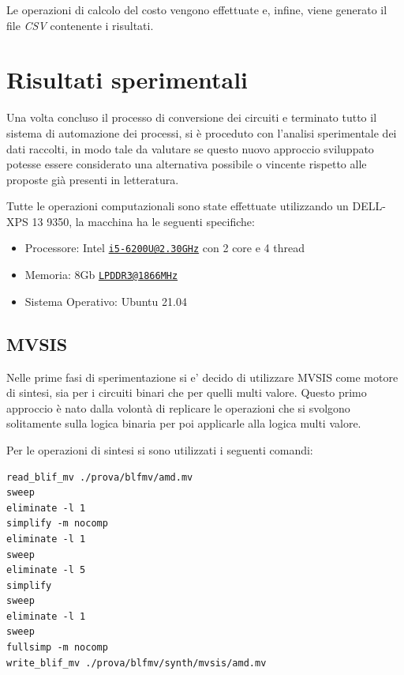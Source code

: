 \documentclass[
]{book}
\providecommand{\tightlist}{%
  \setlength{\itemsep}{0pt}\setlength{\parskip}{0pt}}
\begin{document}
Le operazioni di calcolo del costo vengono effettuate e, infine, viene generato il file \emph{CSV} contenente i risultati.

\hypertarget{risultati-sperimentali}{%
\chapter{Risultati sperimentali}\label{risultati-sperimentali}}

Una volta concluso il processo di conversione dei circuiti e terminato tutto il sistema di automazione dei processi, si è proceduto con l'analisi sperimentale dei dati raccolti, in modo tale da valutare se questo nuovo approccio sviluppato potesse essere considerato una alternativa possibile o vincente rispetto alle proposte già presenti in letteratura.

Tutte le operazioni computazionali sono state effettuate utilizzando un DELL-XPS 13 9350, la macchina ha le seguenti specifiche:

\begin{itemize}
\tightlist
\item
  Processore: Intel \href{mailto:i5-6200U@2.30GHz}{\nolinkurl{i5-6200U@2.30GHz}} con 2 core e 4 thread
\item
  Memoria: 8Gb \href{mailto:LPDDR3@1866MHz}{\nolinkurl{LPDDR3@1866MHz}}
\item
  Sistema Operativo: Ubuntu 21.04
\end{itemize}

\newpage

\hypertarget{mvsis-2}{%
\section{MVSIS}\label{mvsis-2}}

Nelle prime fasi di sperimentazione si e' decido di utilizzare MVSIS come motore di sintesi, sia per i circuiti binari che per quelli multi valore. Questo primo approccio è nato dalla volontà di replicare le operazioni che si svolgono solitamente sulla logica binaria per poi applicarle alla logica multi valore.

Per le operazioni di sintesi si sono utilizzati i seguenti comandi:

\begin{verbatim}
read_blif_mv ./prova/blfmv/amd.mv
sweep
eliminate -l 1
simplify -m nocomp
eliminate -l 1
sweep
eliminate -l 5
simplify
sweep
eliminate -l 1
sweep
fullsimp -m nocomp
write_blif_mv ./prova/blfmv/synth/mvsis/amd.mv
\end{verbatim}
\end{document}
